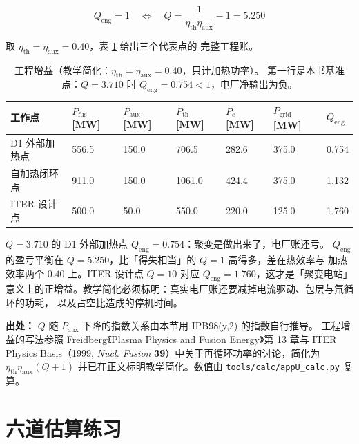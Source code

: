 \begin{equation}
Q_{\mathrm{eng}} = 1 \quad\Longleftrightarrow\quad
Q = \frac{1}{\eta_{\mathrm{th}}\eta_{\mathrm{aux}}} - 1 = 5.250
\label{eq:app-u-qeng1}
\end{equation}

取 $\eta_{\mathrm{th}} = \eta_{\mathrm{aux}} = 0.40$，表 \ref{tab:app-u-qeng} 给出三个代表点的
完整工程账。

\begin{table}[htbp]
\centering
\small
\caption{工程增益（教学简化：$\eta_{\mathrm{th}}=\eta_{\mathrm{aux}}=0.40$，只计加热功率）。
第一行是本书基准点：$Q=3.710$ 时 $Q_{\mathrm{eng}}=0.754<1$，电厂净输出为负。}
\label{tab:app-u-qeng}
\begin{tabular}{@{}p{2.8cm}p{1.6cm}p{1.5cm}p{1.6cm}p{1.6cm}p{1.6cm}p{1.5cm}@{}}
\toprule
工作点 & $P_{\mathrm{fus}}$ [MW] & $P_{\mathrm{aux}}$ [MW] & $P_{\mathrm{th}}$ [MW] & $P_e$ [MW] & $P_{\mathrm{grid}}$ [MW] & $Q_{\mathrm{eng}}$ \\
\midrule
D1 外部加热点    & 556.5 & 150.0 & 706.5  & 282.6 & 375.0 & 0.754 \\
自加热闭环点     & 911.0 & 150.0 & 1061.0 & 424.4 & 375.0 & 1.132 \\
ITER 设计点      & 500.0 & 50.0  & 550.0  & 220.0 & 125.0 & 1.760 \\
\bottomrule
\end{tabular}

\end{table}

$Q=3.710$ 的 D1 外部加热点 $Q_{\mathrm{eng}}=0.754$：聚变是做出来了，电厂账还亏。
$Q_{\mathrm{eng}}$ 的盈亏平衡在 $Q=5.250$，比「得失相当」的 $Q=1$ 高得多，差在热效率与
加热效率两个 $0.40$ 上。ITER 设计点 $Q=10$ 对应 $Q_{\mathrm{eng}}=1.760$，这才是「聚变电站」
意义上的正增益。教学简化必须标明：真实电厂账还要减掉电流驱动、包层与氚循环的功耗，
以及占空比造成的停机时间。

{\footnotesize
\textbf{出处：} $Q$ 随 $P_{\mathrm{aux}}$ 下降的指数关系由本节用 IPB98(y,2) 的指数自行推导。
工程增益的写法参照 Freidberg《Plasma Physics and Fusion Energy》第 13 章与 ITER Physics
Basis（1999, \textit{Nucl. Fusion} \textbf{39}）中关于再循环功率的讨论，简化为
$\eta_{\mathrm{th}}\eta_{\mathrm{aux}}(Q+1)$ 并已在正文标明教学简化。数值由
\texttt{tools/\allowbreak{}calc/\allowbreak{}appU\_calc.py} 复算。
}

\section{六道估算练习}
\label{sec:app-u-problems}


